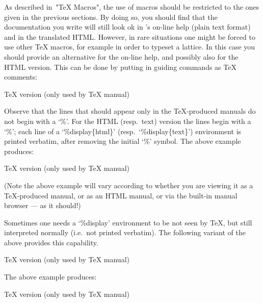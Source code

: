 
As described in~"TeX Macros", the use of macros should be  restricted  to
the ones given in the previous sections. By doing  so,  you  should  find
that the documentation you write will still look ok in  {\GAP}'s  on-line
help (plain text format) and in the translated  HTML.  However,  in  rare
situations one might be forced to use other {\TeX} macros, for example in
order  to  typeset  a  lattice.  In  this  case  you  should  provide  an
alternative for the on-line help, and possibly also for the HTML version.
This can be done by putting in guiding commands as {\TeX} comments:

\begintt
TeX version (only used by TeX manual)
\endtt

Observe that the lines that should appear  only  in  the  {\TeX}-produced
manuals do not begin with a `\%'. For the HTML (resp.~text)  version  the
lines  begin  with  a  `\%';   each   line   of   a   `\%display\{html\}'
(resp.~`\%display\{text\}')  environment  is  printed   verbatim,   after
removing the initial `\%' symbol. The above example produces:

TeX version (only used by TeX manual)

(Note the above example will vary according to whether you are viewing it
as a {\TeX}-produced manual,  or as an HTML manual,  or via the  built-in
manual browser --- as it should!)

Sometimes one needs a `\%display' environment to be not seen  by  {\TeX},
but still interpreted normally (i.e.~not printed verbatim). The following
variant of the above provides this capability.

\begintt
TeX version (only used by TeX manual)
\endtt

The above example produces:

TeX version (only used by TeX manual)

